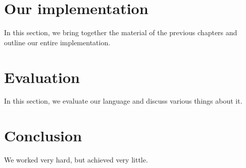 \documentclass[12pt]{article}
\begin{document}
\section{Our implementation}\label{sec:our_implementation}

In this section, we bring together the material of the previous chapters and outline our entire implementation.

\section{Evaluation}\label{sec:evaluation}

In this section, we evaluate our language and discuss various things about it.

\section{Conclusion}\label{sec:conclusion}

We worked very hard, but achieved very little.



\end{document}
